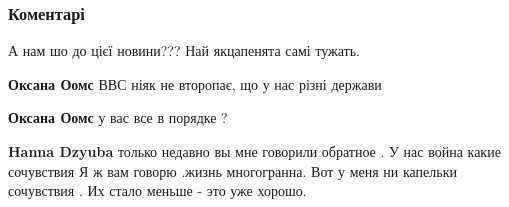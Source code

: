  
 
 
 
 
\subsubsection{Коментарі}
\label{sec:08_08_2021.fb.bbc_news_ukrainian.1.aviakatastrofa_kamchatka.cmt}

\begin{itemize}
 
А нам шо до цієї новини??? Най якцапенята самі тужать.

\begin{itemize}
 
\textbf{Оксана Оомс} ВВС ніяк не второпає, що у нас різні держави

 
\textbf{Оксана Оомс} у вас все в порядке ?

\begin{itemize}
 
\textbf{Hanna Dzyuba} только недавно вы мне говорили обратное . У нас война какие сочувствия
Я ж вам говорю .жизнь многогранна.
Вот у меня ни капельки сочувствия . Их стало меньше - это уже хорошо.


\end{itemize}
\end{itemize}
\end{itemize}
